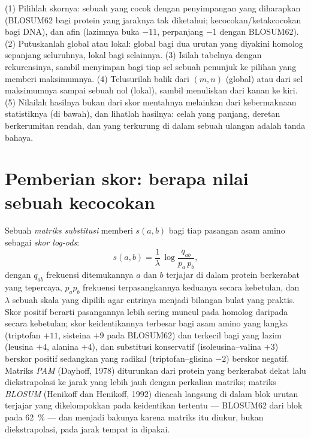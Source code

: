 \begin{method}\label{met:b3:bioinformatics:align}
(1) Pilihlah skornya: sebuah  yang cocok dengan
penyimpangan yang diharapkan (BLOSUM62 bagi protein yang jaraknya tak
diketahui; kecocokan/ketakcocokan bagi DNA), dan  afin (lazimnya
buka $-11$, perpanjang $-1$ dengan BLOSUM62). (2) Putuskanlah global atau
lokal: global bagi dua urutan yang diyakini homolog sepanjang seluruhnya,
lokal bagi selainnya. (3) Isilah tabelnya dengan rekurensinya, sambil menyimpan
bagi tiap sel sebuah penunjuk ke pilihan yang memberi maksimumnya. (4)
Telusurilah balik dari $(m,n)$ (global) atau dari sel maksimumnya sampai
sebuah nol (lokal), sambil menuliskan  dari kanan ke kiri. (5)
Nilailah hasilnya bukan dari skor mentahnya melainkan dari kebermaknaan
statistiknya (di bawah), dan lihatlah hasilnya: celah yang panjang, deretan
berkerumitan rendah, dan  yang terkurung di dalam sebuah ulangan
adalah tanda bahaya.
\end{method}

\section{Pemberian skor: berapa nilai sebuah kecocokan}

\begin{definition}\label{def:b3:bioinformatics:matrices}
Sebuah \emph{matriks substitusi} memberi $s(a,b)$ bagi tiap pasangan asam
amino sebagai \emph{skor log-ods}:
\[
s(a,b) = \frac{1}{\lambda}\,\log\frac{q_{ab}}{p_{a}\,p_{b}},
\]
dengan $q_{ab}$ frekuensi ditemukannya $a$ dan $b$ terjajar di dalam
 protein berkerabat yang tepercaya, $p_{a} p_{b}$ frekuensi
terpasangkannya keduanya secara kebetulan, dan $\lambda$ sebuah skala yang
dipilih agar entrinya menjadi bilangan bulat yang praktis. Skor positif
berarti pasangannya lebih sering muncul pada homolog daripada secara
kebetulan; skor keidentikannya terbesar bagi asam amino yang langka
(triptofan $+11$, sisteina $+9$ pada BLOSUM62) dan terkecil bagi yang lazim
(leusina $+4$, alanina $+4$), dan substitusi konservatif (isoleusina--valina
$+3$) berskor positif sedangkan yang radikal (triptofan--glisina $-2$)
berskor negatif. Matriks \emph{PAM} (Dayhoff, 1978) diturunkan dari protein
yang berkerabat dekat lalu diekstrapolasi ke jarak yang lebih jauh dengan
perkalian matriks; matriks \emph{BLOSUM} (Henikoff dan Henikoff, 1992)
dicacah langsung di dalam blok urutan terjajar yang dikelompokkan pada
keidentikan tertentu --- BLOSUM62 dari blok pada \qty{62}{\%} --- dan menjadi
bakunya karena matriks itu diukur, bukan diekstrapolasi, pada jarak tempat ia
dipakai.
\end{definition}

